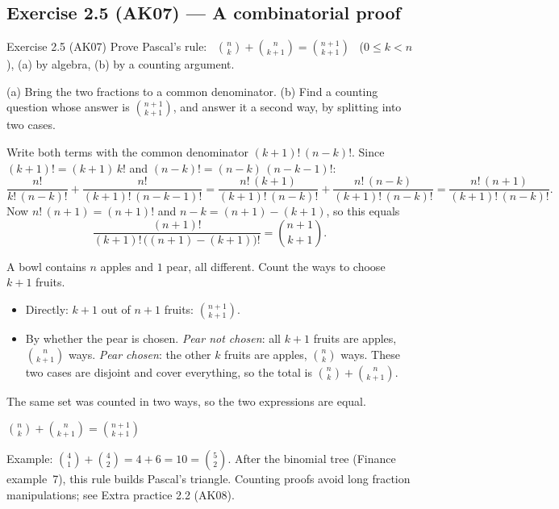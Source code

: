 \subsection{Exercise 2.5 (AK07) --- A combinatorial proof}

\begin{task}{Exercise 2.5 (AK07)}
	Prove Pascal's rule: \ $\displaystyle\binom nk+\binom n{k+1}=\binom{n+1}{k+1}$
	\ ($0\le k<n$), (a) by algebra, (b) by a counting argument.
\end{task}
\workspace{4cm}

\ifsolutions
	\soltitle
	\idea (a) Bring the two fractions to a common denominator. (b) Find a
	counting question whose answer is $\binom{n+1}{k+1}$, and answer it a second
	way, by splitting into two cases.

	 Write both terms with the common denominator
	$(k+1)!\,(n-k)!$. Since $(k+1)!=(k+1)\,k!$ and $(n-k)!=(n-k)\,(n-k-1)!$:
	\[
		\frac{n!}{k!\,(n-k)!}+\frac{n!}{(k+1)!\,(n-k-1)!}
		=\frac{n!\,(k+1)}{(k+1)!\,(n-k)!}+\frac{n!\,(n-k)}{(k+1)!\,(n-k)!}
		=\frac{n!\,(n+1)}{(k+1)!\,(n-k)!}.
	\]
	Now $n!\,(n+1)=(n+1)!$ and $n-k=(n+1)-(k+1)$, so this equals
	\[ \frac{(n+1)!}{(k+1)!\,\big((n+1)-(k+1)\big)!}=\binom{n+1}{k+1}. \]

	 A bowl contains $n$
	apples and $1$ pear, all different. Count the ways to choose $k+1$ fruits.
	\begin{itemize}[nosep]
		\item Directly: $k+1$ out of $n+1$ fruits: $\binom{n+1}{k+1}$.
		\item By whether the pear is chosen. \emph{Pear not chosen}: all $k+1$
		      fruits are apples, $\binom n{k+1}$ ways. \emph{Pear chosen}: the
		      other $k$ fruits are apples, $\binom nk$ ways. These two cases are
		      disjoint and cover everything, so the total is
		      $\binom nk+\binom n{k+1}$.
	\end{itemize}
	The same set was counted in two ways, so the two expressions are equal.
	\begin{answer}
		$\binom nk+\binom n{k+1}=\binom{n+1}{k+1}$
	\end{answer}
	\begin{remark}
		Example: $\binom41+\binom42=4+6=10=\binom52$. After the binomial tree
		(Finance example~7), this rule builds Pascal's triangle. Counting proofs
		avoid long fraction manipulations; see Extra practice 2.2 (AK08).
	\end{remark}
\fi


